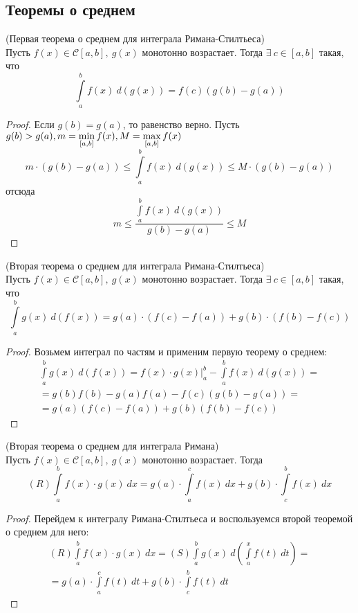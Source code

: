 \subsection{Теоремы о среднем}
\begin{theorem}
    (Первая теорема о среднем для интеграла Римана-Стилтьеса)\\ 
    Пусть $f(x)\in \mathcal{C}[a,b],\ g(x)$ монотонно возрастает. Тогда $\exists\ c\in [a,b]$ такая, что
    \[\int\limits_{a}^{b}f(x)\ d(g(x))=f(c)(g(b)-g(a))\]
\end{theorem} 
\begin{proof}
    Если $g(b)=g(a)$, то равенство верно.
    Пусть $g(b)>g(a),\\ m=\min\limits_{[a,b]} f(x), M=\max\limits_{[a,b]} f(x)$
    \[m\cdot(g(b)-g(a))\leq\int\limits_{a}^{b}f(x)\ d(g(x))\leq M\cdot(g(b)-g(a))\]
    отсюда
    \[m\leq \frac{\int\limits_{a}^{b}f(x)\ d(g(x))}{g(b)- g(a)}\leq M\]
\end{proof} 
\begin{theorem}
    (Вторая теорема о среднем для интеграла Римана-Стилтьеса)\\
    Пусть $f(x)\in \mathcal{C}[a,b],\ g(x)$ монотонно возрастает. Тогда $\exists\ c\in [a,b]$ такая, что
    \[\int\limits_{a}^{b}g(x)\ d(f(x))=g(a)\cdot(f(c)-f(a))+g(b)\cdot (f(b)-f(c))\]
\end{theorem} 
\begin{proof} Возьмем интеграл по частям и применим первую теорему о среднем:
    \begin{multline*}
        \int\limits_{a}^{b}g(x)\ d(f(x))=f(x)\cdot g(x)|^b_a-\int\limits_{a}^{b}f(x)\ d(g(x))=\\=
        g(b)f(b)-g(a)f(a)-f(c)(g(b)-g(a))=\\
        =g(a)(f(c)-f(a))+g(b)(f(b)-f(c))
    \end{multline*}
\end{proof} 
\begin{consequense}
    (Вторая теорема о среднем для интеграла Римана)\\
    Пусть $f(x)\in \mathcal{C}[a,b],\ g(x)$ монотонно возрастает. Тогда
    \[(R)\int\limits_{a}^{b}f(x)\cdot g(x)\ dx=g(a)\cdot \int\limits_{a}^{c}f(x)\ dx+g(b)\cdot \int\limits_{c}^{b}f(x)\ dx\]
\end{consequense} 
\begin{proof} Перейдем к интегралу Римана-Стилтьеса и воспользуемся второй теоремой о среднем для него:
    \begin{multline*}
        (R)\int\limits_{a}^{b}f(x)\cdot g(x)\ dx=(S) \int\limits_{a}^{b}g(x)\ d\left(\int\limits_{a}^{x}f(t)\ dt\right)=\\
        =g(a)\cdot \int\limits_{a}^{c}f(t)\ dt+g(b)\cdot \int\limits_{c}^{b}f(t)\ dt
    \end{multline*}
\end{proof} 